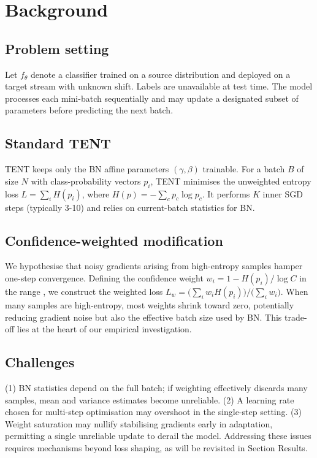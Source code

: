 \documentclass{article} %
\begin{document}
\section{Background}
\label{sec:background}
\subsection{Problem setting}
Let \(f_{\theta}\) denote a classifier trained on a source distribution and deployed on a target stream with unknown shift. Labels are unavailable at test time. The model processes each mini-batch sequentially and may update a designated subset of parameters before predicting the next batch.

\subsection{Standard TENT}
TENT keeps only the BN affine parameters \((\gamma, \beta)\) trainable. For a batch \(B\) of size \(N\) with class-probability vectors \(p_{i}\), TENT minimises the unweighted entropy loss \(L = \sum_{i} H(p_{i})\), where \(H(p) = -\sum_{c} p_{c} \log p_{c}\). It performs \(K\) inner SGD steps (typically 3-10) and relies on current-batch statistics for BN.

\subsection{Confidence-weighted modification}
We hypothesise that noisy gradients arising from high-entropy samples hamper one-step convergence. Defining the confidence weight \(w_{i} = 1 - H(p_{i})/\log C\) in the range , we construct the weighted loss \(L_{w} = \big(\sum_{i} w_{i} H(p_{i})\big) / \big(\sum_{i} w_{i}\big)\). When many samples are high-entropy, most weights shrink toward zero, potentially reducing gradient noise but also the effective batch size used by BN. This trade-off lies at the heart of our empirical investigation.

\subsection{Challenges}
(1) BN statistics depend on the full batch; if weighting effectively discards many samples, mean and variance estimates become unreliable. (2) A learning rate chosen for multi-step optimisation may overshoot in the single-step setting. (3) Weight saturation may nullify stabilising gradients early in adaptation, permitting a single unreliable update to derail the model. Addressing these issues requires mechanisms beyond loss shaping, as will be revisited in Section Results.
\end{document}

